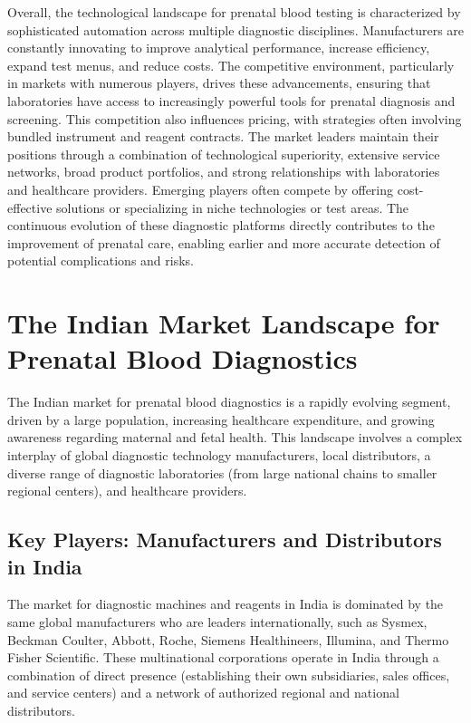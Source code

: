 \documentclass{article}
\begin{document}
Overall, the technological landscape for prenatal blood testing is characterized by sophisticated automation across multiple diagnostic disciplines. Manufacturers are constantly innovating to improve analytical performance, increase efficiency, expand test menus, and reduce costs. The competitive environment, particularly in markets with numerous players, drives these advancements, ensuring that laboratories have access to increasingly powerful tools for prenatal diagnosis and screening. This competition also influences pricing, with strategies often involving bundled instrument and reagent contracts. The market leaders maintain their positions through a combination of technological superiority, extensive service networks, broad product portfolios, and strong relationships with laboratories and healthcare providers. Emerging players often compete by offering cost-effective solutions or specializing in niche technologies or test areas. The continuous evolution of these diagnostic platforms directly contributes to the improvement of prenatal care, enabling earlier and more accurate detection of potential complications and risks.

\section{The Indian Market Landscape for Prenatal Blood Diagnostics}

The Indian market for prenatal blood diagnostics is a rapidly evolving segment, driven by a large population, increasing healthcare expenditure, and growing awareness regarding maternal and fetal health. This landscape involves a complex interplay of global diagnostic technology manufacturers, local distributors, a diverse range of diagnostic laboratories (from large national chains to smaller regional centers), and healthcare providers.

\subsection{Key Players: Manufacturers and Distributors in India}

The market for diagnostic machines and reagents in India is dominated by the same global manufacturers who are leaders internationally, such as Sysmex, Beckman Coulter, Abbott, Roche, Siemens Healthineers, Illumina, and Thermo Fisher Scientific. These multinational corporations operate in India through a combination of direct presence (establishing their own subsidiaries, sales offices, and service centers) and a network of authorized regional and national distributors.
\end{document}
